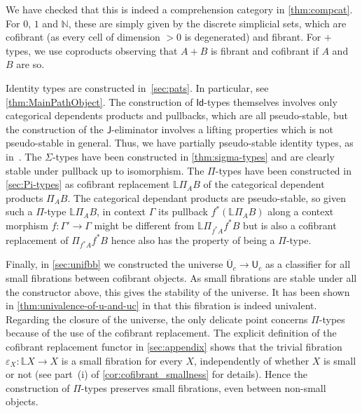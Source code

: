 \documentclass[reqno,10pt,a4paper,oneside]{amsart}
\makeatletter
\renewenvironment{proof}[1][\proofname] {\par\pushQED{\qed}\normalfont\topsep6\p@\@plus6\p@\relax\trivlist\item[\hskip\labelsep\bf#1\@addpunct{.}]\ignorespaces}{\popQED\endtrivlist\@endpefalse}
\numberwithin{equation}{section}
\theoremstyle{mythm}
\theoremstyle{mydef}
\theoremstyle{myrmk}
\newcommand{\co}{\colon}
\newcommand{\UU}{\overline{\mathsf{U}}}
\newcommand{\U}{\mathsf{U}}
\newcommand{\Id}{\mathsf{Id}}
\makeatother
\begin{document}
\begin{proof}
We have checked that this is indeed a comprehension category in \cref{thm:compcat}. 
For $0$, $1$ and $\mathbb{N}$, these are simply given by the discrete simplicial sets, which are cofibrant (as every cell of dimension $>0$ is degenerated) and fibrant. For $+$ types, we use coproducts observing that
 $A + B$ is fibrant and cofibrant if $A$ and $B$ are so. 
 
Identity types are constructed in~\cref{sec:pats}. In particular, see \cref{thm:MainPathObject}. The construction of $\Id$-types themselves involves only categorical dependents products and pullbacks, which are all pseudo-stable, but the construction of the $\mathsf{J}$-eliminator involves a lifting properties which is not pseudo-stable 
in general. Thus, we have partially pseudo-stable identity types, as in~\cite[Definition 2.3.4]{LumsdaineP:locuoc}. The $\Sigma$-types have been constructed in \cref{thm:sigma-types} and are clearly stable under pullback up to isomorphism.  
The $\Pi$-types have been constructed in \cref{sec:Pi-types} as cofibrant replacement $\mathbb{L} \Pi_A B$ of the categorical dependent products $\Pi_A B$. The categorical dependant products are pseudo-stable, so given such a $\Pi$-type $\mathbb{L} \Pi_A B$, in context $\Gamma$ its pullback $f^*( \mathbb{L} \Pi_A B)$ along a context morphism $f \co \Gamma' \rightarrow \Gamma$ might be different from $\mathbb{L} \Pi_{f^* A} f^* B$ but is also a cofibrant replacement of $\Pi_{f^* A} f^* B$ hence also has the property of being a $\Pi$-type.

Finally, in \cref{sec:unifbb} we constructed the universe $\UU_c \rightarrow \U_c$ as a classifier for all small fibrations between cofibrant objects. As small fibrations are stable under all the constructor above, this gives the stability of the universe. It has been shown in \cref{thm:univalence-of-u-and-uc} in that this fibration is indeed univalent. Regarding the closure of the universe, the only delicate point concerns $\Pi$-types because of the
use of the cofibrant replacement.  The explicit definition of the cofibrant replacement functor 
in  \cref{sec:appendix} shows that  the trivial fibration $\varepsilon_X \co \mathbb{L} X \rightarrow X$ is a small fibration for every $X$, independently of whether $X$ is small or not (see part~(i) of \cref{cor:cofibrant_smallness} for details). Hence the construction of $\Pi$-types  preserves small fibrations, even between non-small objects.
\end{proof}
\end{document}
